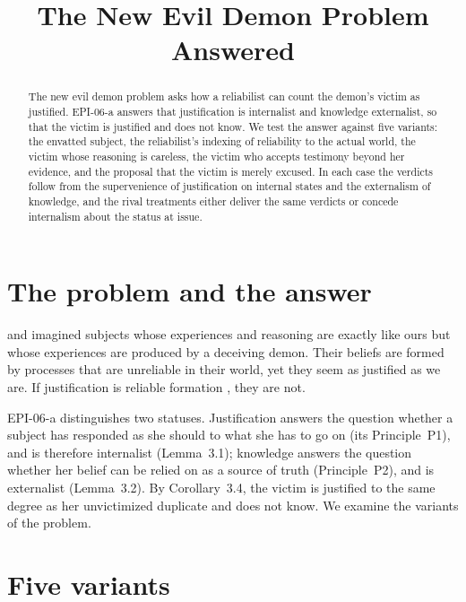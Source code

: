 \documentclass{situationist-preprint}
\title{The New Evil Demon Problem Answered}
\begin{document}
\maketitle

\begin{abstract}
The new evil demon problem asks how a reliabilist can count the demon's victim as justified. EPI-06-a answers that justification is internalist and knowledge externalist, so that the victim is justified and does not know. We test the answer against five variants: the envatted subject, the reliabilist's indexing of reliability to the actual world, the victim whose reasoning is careless, the victim who accepts testimony beyond her evidence, and the proposal that the victim is merely excused. In each case the verdicts follow from the supervenience of justification on internal states and the externalism of knowledge, and the rival treatments either deliver the same verdicts or concede internalism about the status at issue.
\end{abstract}

\section{The problem and the answer}

\citet{LehrerCohen1983} and \citet{Cohen1984} imagined subjects whose experiences and reasoning are exactly like ours but whose experiences are produced by a deceiving demon. Their beliefs are formed by processes that are unreliable in their world, yet they seem as justified as we are. If justification is reliable formation \citep{Goldman1979}, they are not.

EPI-06-a distinguishes two statuses. Justification answers the question whether a subject has responded as she should to what she has to go on (its Principle~P1), and is therefore internalist (Lemma~3.1); knowledge answers the question whether her belief can be relied on as a source of truth (Principle~P2), and is externalist (Lemma~3.2). By Corollary~3.4, the victim is justified to the same degree as her unvictimized duplicate and does not know. We examine the variants of the problem.

\section{Five variants}
\end{document}
